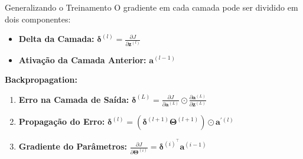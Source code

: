 \documentclass[aspectratio=169, xcolor=dvipsnames]{beamer}
\begin{document}
  
  \begin{frame}{Generalizando o Treinamento}
    O gradiente em cada camada pode ser dividido em dois componentes:
    \begin{itemize}
      \item \textbf{Delta da Camada:}
        $\bm{\delta}^{(l)}= \frac{\partial J}{\partial \mathbf{z}^{(l)}}$

      \item \textbf{Ativação da Camada Anterior:} $\mathbf{a}^{(l-1)}$
    \end{itemize}
    \vfill
    \textbf{Backpropagation:}
    \begin{enumerate}
      \item \textbf{Erro na Camada de Saída:}
        $\bm{\delta}^{(L)}=\frac{\partial J}{\partial \mathbf{a}^{(L)}}\odot\frac{\partial \mathbf{a}^{(L)}}{\partial \mathbf{z}^{(L)}}$
        \vfill

      \item \textbf{Propagação do Erro:}
        $\bm{\delta}^{(l)}=(\bm{\delta}^{(l+1)}\mathbf{\Theta}^{(l+1)})\odot \mathbf{a}^{\prime(l)}$
        \vfill

      \item \textbf{Gradiente do Parâmetros:}
        $\frac{\partial J}{\partial\mathbf{\Theta}^{(i)}}=\bm{\delta}^{(i)^\top}\mathbf{a}^{(i-1)}$
        \vfill


    \end{enumerate}
  \end{frame}
\end{document}
